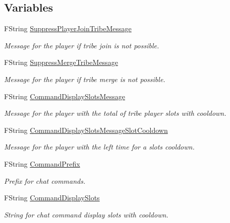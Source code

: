 \subsection*{Variables}
\begin{DoxyCompactItemize}
\item 
F\+String \mbox{\hyperlink{namespace_slot_cooldown_ad9b4de67b82bb1e9f21fd5d5674b34be}{Suppress\+Player\+Join\+Tribe\+Message}}
\begin{DoxyCompactList}\small\item\em Message for the player if tribe join is not possible. \end{DoxyCompactList}\item 
F\+String \mbox{\hyperlink{namespace_slot_cooldown_abd12b2304b5bf308744798daca9419f6}{Suppress\+Merge\+Tribe\+Message}}
\begin{DoxyCompactList}\small\item\em Message for the player if tribe merge is not possible. \end{DoxyCompactList}\item 
F\+String \mbox{\hyperlink{namespace_slot_cooldown_a96c0601961d6636388621ee070136bd8}{Command\+Display\+Slots\+Message}}
\begin{DoxyCompactList}\small\item\em Message for the player with the total of tribe player slots with cooldown. \end{DoxyCompactList}\item 
F\+String \mbox{\hyperlink{namespace_slot_cooldown_ac0a5c9ed81d34ecf571126bc0ce8e1e7}{Command\+Display\+Slots\+Message\+Slot\+Cooldown}}
\begin{DoxyCompactList}\small\item\em Message for the player with the left time for a slots cooldown. \end{DoxyCompactList}\item 
F\+String \mbox{\hyperlink{namespace_slot_cooldown_a5b94faf2e06664e82c8811880e3ac662}{Command\+Prefix}}
\begin{DoxyCompactList}\small\item\em Prefix for chat commands. \end{DoxyCompactList}\item 
F\+String \mbox{\hyperlink{namespace_slot_cooldown_a5785ecad34ad6558721c26503620eeb2}{Command\+Display\+Slots}}
\begin{DoxyCompactList}\small\item\em String for chat command display slots with cooldown. \end{DoxyCompactList}\item 

\end{DoxyCompactItemize}
